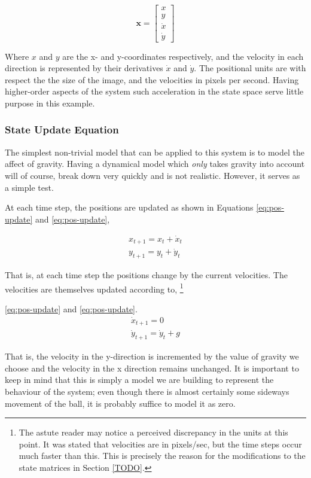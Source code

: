 \begin{equation}\label{eq:basket-state-space}
\mathbf{x} =
\begin{bmatrix}
x \\ y \\ \dot{x} \\ \dot{y}
\end{bmatrix}
\end{equation}

Where $x$ and $y$ are the x- and y-coordinates respectively, and the velocity
in each direction is represented by their derivatives $\dot{x}$ and $\dot{y}$.
The positional units are with respect the the size of the image, and the velocities
in pixels per second. Having higher-order aspects of the system such acceleration
in the state space serve little purpose in this example.

\subsubsection{State Update Equation}
The simplest non-trivial model that can be applied to this system is to model
the affect of gravity. Having a dynamical model which \emph{only} takes gravity
into account will of course, break down very quickly and is not realistic. However,
it serves as a simple test.

At each time step, the positions are updated as shown in Equations
\ref{eq:pos-update} and \ref{eq:pos-update},

\begin{align}
x_{t+1} = x_{t} + \dot{x}_{t} \\
y_{t+1} = y_{t} + \dot{y}_{t}
\end{align}

That is, at each time step the positions change by the current velocities.
The velocities are themselves updated according to,
\footnote{The astute reader may notice a
perceived discrepancy in the units
at this point. It was stated that velocities are in pixels/sec, but the time
steps occur much faster than this. This is precisely the reason for the
modifications to the state matrices in Section \ref{TODO}.
}

\ref{eq:pos-update} and \ref{eq:pos-update}.
\begin{align}
\dot{x}_{t+1} = 0 \\
\dot{y}_{t+1} = \dot{y}_{t} + g
\end{align}

That is, the velocity in the y-direction is incremented by the value of gravity
we choose and the velocity in the x direction remains unchanged.
It is important to keep in mind that this is simply a model we are building to
represent the behaviour of the
system; even though there is almost certainly some sideways movement of the ball,
it is probably suffice to model it as zero.

